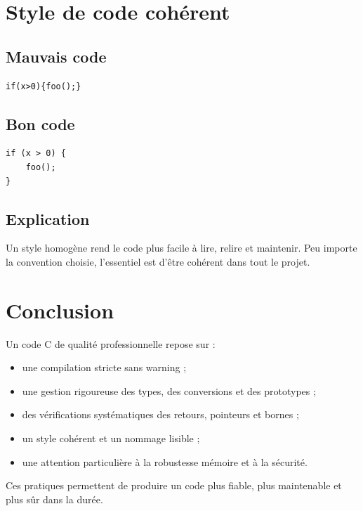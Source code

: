 \documentclass[a4paper,11pt]{report}
\begin{document}
\chapter{Style de code cohérent}

\section{Mauvais code}
\begin{lstlisting}
if(x>0){foo();}
\end{lstlisting}

\section{Bon code}
\begin{lstlisting}
if (x > 0) {
    foo();
}
\end{lstlisting}

\section{Explication}
Un style homogène rend le code plus facile à lire, relire et maintenir.
Peu importe la convention choisie, l'essentiel est d'être cohérent dans tout le projet.

\chapter{Conclusion}

Un code C de qualité professionnelle repose sur :
\begin{itemize}
    \item une compilation stricte sans warning ;
    \item une gestion rigoureuse des types, des conversions et des prototypes ;
    \item des vérifications systématiques des retours, pointeurs et bornes ;
    \item un style cohérent et un nommage lisible ;
    \item une attention particulière à la robustesse mémoire et à la sécurité.
\end{itemize}

Ces pratiques permettent de produire un code plus fiable, plus maintenable et plus sûr dans la durée.
\end{document}
